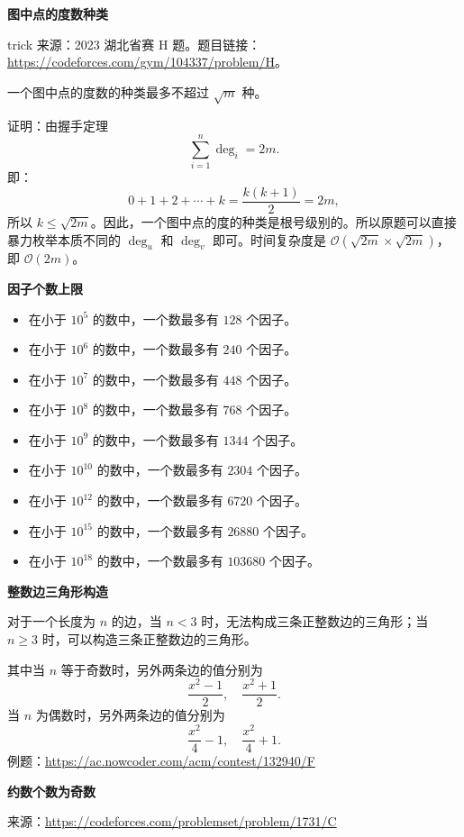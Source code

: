 \par\medskip\noindent\textbf{图中点的度数种类}\par\smallskip
trick 来源：2023 湖北省赛 H 题。题目链接：\url{https://codeforces.com/gym/104337/problem/H}。

一个图中点的度数的种类最多不超过 $\sqrt{m}$ 种。

证明：由握手定理
\[
\sum_{i=1}^{n}\deg_i=2m.
\]
即：
\[
0+1+2+\cdots+k=\frac{k(k+1)}{2}=2m,
\]
所以 $k\le \sqrt{2m}$。因此，一个图中点的度的种类是根号级别的。所以原题可以直接暴力枚举本质不同的 $\deg_u$ 和 $\deg_v$ 即可。时间复杂度是 $\mathcal{O}(\sqrt{2m}\times\sqrt{2m})$，即 $\mathcal{O}(2m)$。

\par\medskip\noindent\textbf{因子个数上限}\par\smallskip
\begin{itemize}
  \item 在小于 $10^5$ 的数中，一个数最多有 $128$ 个因子。
  \item 在小于 $10^6$ 的数中，一个数最多有 $240$ 个因子。
  \item 在小于 $10^7$ 的数中，一个数最多有 $448$ 个因子。
  \item 在小于 $10^8$ 的数中，一个数最多有 $768$ 个因子。
  \item 在小于 $10^9$ 的数中，一个数最多有 $1344$ 个因子。
  \item 在小于 $10^{10}$ 的数中，一个数最多有 $2304$ 个因子。
  \item 在小于 $10^{12}$ 的数中，一个数最多有 $6720$ 个因子。
  \item 在小于 $10^{15}$ 的数中，一个数最多有 $26880$ 个因子。
  \item 在小于 $10^{18}$ 的数中，一个数最多有 $103680$ 个因子。
\end{itemize}

\par\medskip\noindent\textbf{整数边三角形构造}\par\smallskip
对于一个长度为 $n$ 的边，当 $n<3$ 时，无法构成三条正整数边的三角形；当 $n\ge 3$ 时，可以构造三条正整数边的三角形。

其中当 $n$ 等于奇数时，另外两条边的值分别为
\[
\frac{x^2-1}{2},\quad \frac{x^2+1}{2}.
\]
当 $n$ 为偶数时，另外两条边的值分别为
\[
\frac{x^2}{4}-1,\quad \frac{x^2}{4}+1.
\]
例题：\url{https://ac.nowcoder.com/acm/contest/132940/F}

\par\medskip\noindent\textbf{约数个数为奇数}\par\smallskip
来源：\url{https://codeforces.com/problemset/problem/1731/C}

